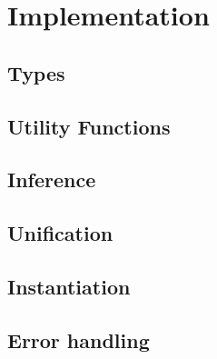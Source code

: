\chapter{Implementation}
\section{Types}
\section{Utility Functions}
\section{Inference}
\section{Unification}
\section{Instantiation}
\section{Error handling} 
